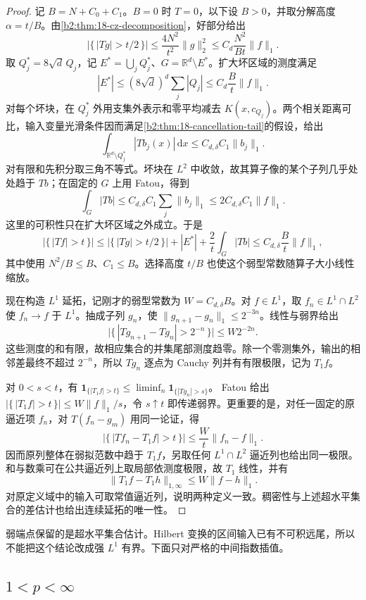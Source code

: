 \begin{proof}
记 \(B=N+C_0+C_1\)。\(B=0\) 时 \(T=0\)，以下设 \(B>0\)，并取分解高度 \(\alpha=t/B\)。由\cref{b2:thm:18-cz-decomposition}，好部分给出
\[
 \bigl|\{\,|Tg|>t/2\,\}\bigr|
 \leq\frac{4N^2}{t^2}\|g\|_2^2
 \leq C_d\frac{N^2}{Bt}\|f\|_1.
\]
取 \(Q_j^*=8\sqrt d\,Q_j\)，记 \(E^*=\bigcup_jQ_j^*\)、\(G=\mathbb R^d\setminus E^*\)。扩大坏区域的测度满足
\[
 |E^*|\leq(8\sqrt d)^d\sum_j|Q_j|
 \leq C_d\frac B t\|f\|_1.
\]
对每个坏块，在 \(Q_j^*\) 外用支集外表示和零平均减去 \(K(x,c_{Q_j})\)。两个相关距离可比，输入变量光滑条件因而满足\cref{b2:thm:18-cancellation-tail}的假设，给出
\[
 \int_{\mathbb R^d\setminus Q_j^*}|Tb_j(x)|\,\mathrm dx
 \leq C_{d,\delta}C_1\|b_j\|_1.
\]
对有限和先积分取三角不等式。坏块在 \(L^2\) 中收敛，故其算子像的某个子列几乎处处趋于 \(Tb\)；在固定的 \(G\) 上用 Fatou，得到
\[
 \int_G|Tb|
 \leq C_{d,\delta}C_1\sum_j\|b_j\|_1
 \leq2C_{d,\delta}C_1\|f\|_1.
\]
这里的可积性只在扩大坏区域之外成立。于是
\[
 \bigl|\{\,|Tf|>t\,\}\bigr|
 \leq \bigl|\{\,|Tg|>t/2\,\}\bigr|+|E^*|
       +\frac2t\int_G|Tb|
 \leq C_{d,\delta}\frac B t\|f\|_1,
\]
其中使用 \(N^2/B\leq B\)、\(C_1\leq B\)。选择高度 \(t/B\) 也使这个弱型常数随算子大小线性缩放。

现在构造 \(L^1\) 延拓，记刚才的弱型常数为 \(W=C_{d,\delta}B\)。对 \(f\in L^1\)，取 \(f_n\in L^1\cap L^2\) 使 \(f_n\to f\) 于 \(L^1\)。抽成子列 \(g_n\)，使 \(\|g_{n+1}-g_n\|_1\leq2^{-3n}\)。线性与弱界给出
\[
 \bigl|\{\,|Tg_{n+1}-Tg_n|>2^{-n}\,\}\bigr|\leq W2^{-2n}.
\]
这些测度的和有限，故相应集合的并集尾部测度趋零。除一个零测集外，输出的相邻差最终不超过 \(2^{-n}\)，所以 \(Tg_n\) 逐点为 Cauchy 列并有有限极限，记为 \(T_1f\)。

对 \(0<s<t\)，有
\(\mathbf1_{\{|T_1f|>t\}}\leq\liminf_n\mathbf1_{\{|Tg_n|>s\}}\)。
Fatou 给出 \(\bigl|\{\,|T_1f|>t\,\}\bigr|\leq W\|f\|_1/s\)，令 \(s\uparrow t\) 即传递弱界。更重要的是，对任一固定的原逼近项 \(f_n\)，对 \(T(f_n-g_m)\) 用同一论证，得
\[
 \bigl|\{\,|Tf_n-T_1f|>t\,\}\bigr|
 \leq \frac Wt\|f_n-f\|_1.
\]
因而原列整体在弱拟范数中趋于 \(T_1f\)，另取任何 \(L^1\cap L^2\) 逼近列也给出同一极限。和与数乘可在公共逼近列上取局部依测度极限，故 \(T_1\) 线性，并有
\[
 \|T_1f-T_1h\|_{1,\infty}\leq W\|f-h\|_1.
\]
对原定义域中的输入可取常值逼近列，说明两种定义一致。稠密性与上述超水平集合的差估计也给出连续延拓的唯一性。
\end{proof}

弱端点保留的是超水平集合估计。Hilbert 变换的区间输入已有不可积远尾，所以不能把这个结论改成强 \(L^1\) 有界。下面只对严格的中间指数插值。

\subsection{\texorpdfstring{\(1<p<\infty\)}{1<p<∞}}
\label{b2:subsec:180403}

